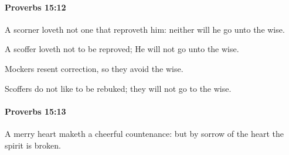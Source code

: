 		\paragraph{Proverbs 15:12} %
			\label{PROVERBS-15-12}

			A scorner loveth not one that reproveth him: neither will he go unto the wise.

			\begin{versebox}
					\item[BHS] 
					\item[ASV] A scoffer loveth not to be reproved; He will not go unto the wise.
					\item[NIV] Mockers resent correction, so they avoid the wise.
					\item[NRSV] Scoffers do not like to be rebuked; they will not go to the wise.
			\end{versebox}

		\paragraph{Proverbs 15:13} %
			\label{PROVERBS-15-13}

			A merry heart maketh a cheerful countenance: but by sorrow of the heart the spirit is broken.

